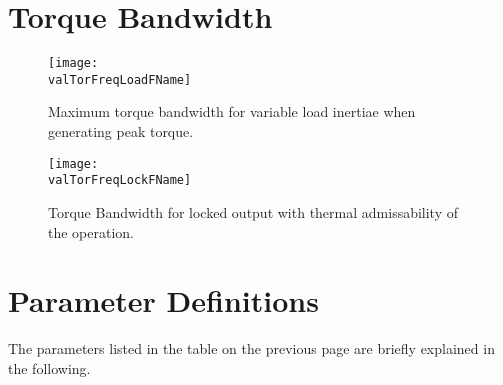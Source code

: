 \documentclass[a4paper,10pt]{cjtdsheet}      %
\begin{document}
\lipsum[1-3]

\section*{Torque Bandwidth}
\begin{figure}[tb]
	\caption{Maximum torque bandwidth for variable load inertiae when generating peak torque.}
  \texttt{[image: \\valTorFreqLoadFName]}
	\label{fig:TorqueBandwidthLoad}
\end{figure}

\lipsum[1-3]

\begin{figure}[tb]
	\caption{Torque Bandwidth for locked output with thermal admissability of the operation.}
  \texttt{[image: \\valTorFreqLockFName]}
	\label{fig:TorqueBandwidthLocked}
\end{figure}


\section*{Parameter Definitions}
The parameters listed in the table on the previous page are briefly explained in the following.
\end{document}
